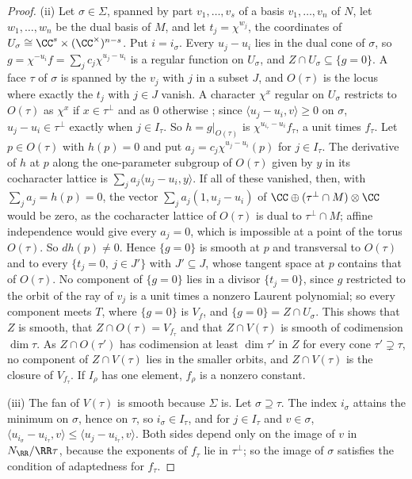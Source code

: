 \begin{proof}
(ii) Let $\sigma\in\Sigma$, spanned by part $v_{1},\dots,v_{s}$ of a basis
$v_{1},\dots,v_{n}$ of $N$, let $w_{1},\dots,w_{n}$ be the dual basis of $M$,
and let $t_{j}=\chi^{w_{j}}$, the coordinates of
$U_{\sigma}\cong\CC^{s}\times(\CC^{\times})^{n-s}$. Put $i=i_{\sigma}$. Every
$u_{j}-u_{i}$ lies in the dual cone of $\sigma$, so
$g=\chi^{-u_{i}}f=\sum_{j}c_{j}\chi^{u_{j}-u_{i}}$ is a regular function on
$U_{\sigma}$, and $Z\cap U_{\sigma}\subseteq\{g=0\}$. A face $\tau$ of
$\sigma$ is spanned by the $v_{j}$ with $j$ in a subset $J$, and $O(\tau)$ is
the locus where exactly the $t_{j}$ with $j\in J$ vanish. A character
$\chi^{x}$ regular on $U_{\sigma}$ restricts to $O(\tau)$ as $\chi^{x}$ if
$x\in\tau^{\perp}$ and as $0$ otherwise \cite[Chapter~3]{CLS11}; since
$\langle u_{j}-u_{i},v\rangle\ge0$ on $\sigma$, $u_{j}-u_{i}\in\tau^{\perp}$
exactly when $j\in I_{\tau}$. So $h=g|_{O(\tau)}$ is
$\chi^{u_{i_{\tau}}-u_{i}}f_{\tau}$, a unit times $f_{\tau}$. Let $p\in
O(\tau)$ with $h(p)=0$ and put $a_{j}=c_{j}\chi^{u_{j}-u_{i}}(p)$ for $j\in
I_{\tau}$. The derivative of $h$ at $p$ along the one-parameter subgroup of
$O(\tau)$ given by $y$ in its cocharacter lattice is $\sum_{j}a_{j}\langle
u_{j}-u_{i},y\rangle$. If all of these vanished, then, with
$\sum_{j}a_{j}=h(p)=0$, the vector $\sum_{j}a_{j}(1,u_{j}-u_{i})$ of
$\CC\oplus(\tau^{\perp}\cap M)\otimes\CC$ would be zero, as the cocharacter
lattice of $O(\tau)$ is dual to $\tau^{\perp}\cap M$; affine independence
would give every $a_{j}=0$, which is impossible at a point of the torus
$O(\tau)$. So $dh(p)\ne0$. Hence $\{g=0\}$ is smooth at $p$ and transversal
to $O(\tau)$ and to every $\{t_{j}=0,\ j\in J'\}$ with $J'\subseteq J$, whose
tangent space at $p$ contains that of $O(\tau)$. No component of $\{g=0\}$
lies in a divisor $\{t_{j}=0\}$, since $g$ restricted to the orbit of the
ray of $v_{j}$ is a unit times a nonzero Laurent polynomial; so every
component meets $T$, where $\{g=0\}$ is $V_{f}$, and
$\{g=0\}=Z\cap U_{\sigma}$. This shows that $Z$ is smooth, that
$Z\cap O(\tau)=V_{f_{\tau}}$ and that $Z\cap V(\tau)$ is smooth of
codimension $\dim\tau$. As $Z\cap O(\tau')$ has codimension at least
$\dim\tau'$ in $Z$ for every cone $\tau'\supsetneq\tau$, no component of
$Z\cap V(\tau)$ lies in the smaller orbits, and $Z\cap V(\tau)$ is the
closure of $V_{f_{\tau}}$. If $I_{\rho}$ has one element, $f_{\rho}$ is a
nonzero constant.

(iii) The fan of $V(\tau)$ is smooth because $\Sigma$ is. Let $\sigma\supseteq
\tau$. The index $i_{\sigma}$ attains the minimum on $\sigma$, hence on
$\tau$, so $i_{\sigma}\in I_{\tau}$, and for $j\in I_{\tau}$ and $v\in\sigma$,
$\langle u_{i_{\sigma}}-u_{i_{\tau}},v\rangle\le\langle
u_{j}-u_{i_{\tau}},v\rangle$. Both sides depend only on the image of $v$ in
$N_{\RR}/\RR\tau$, because the exponents of $f_{\tau}$ lie in $\tau^{\perp}$;
so the image of $\sigma$ satisfies the condition of adaptedness for
$f_{\tau}$.
\end{proof}

